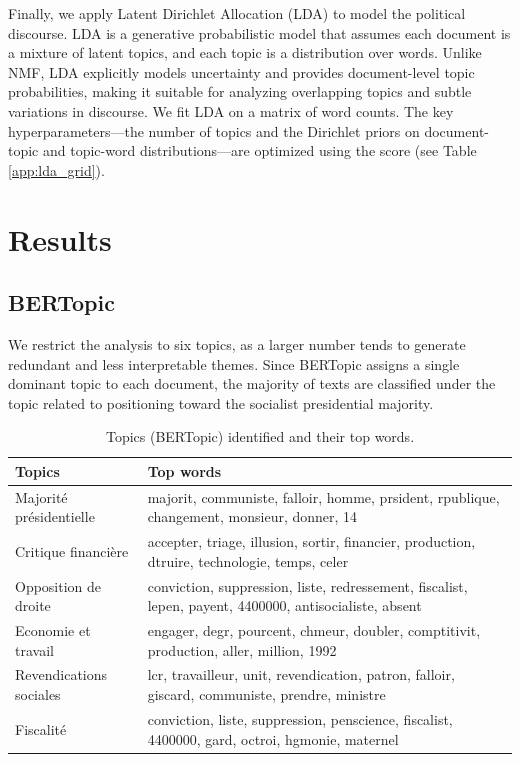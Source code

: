 \documentclass{article}
\begin{document}
Finally, we apply Latent Dirichlet Allocation (LDA) \citep{blei2003latent} to model the political discourse. LDA is a generative probabilistic model that assumes each document is a mixture of latent topics, and each topic is a distribution over words. Unlike NMF, LDA explicitly models uncertainty and provides document-level topic probabilities, making it suitable for analyzing overlapping topics and subtle variations in discourse. We fit LDA on a matrix of word counts. The key hyperparameters—the number of topics and the Dirichlet priors on document-topic and topic-word distributions—are optimized using the score  (see Table \ref{app:lda_grid}).

\section{Results}

\subsection{BERTopic}
We restrict the analysis to six topics, as a larger number tends to generate redundant and less interpretable themes. Since BERTopic assigns a single dominant topic to each document, the majority of texts are classified under the topic related to positioning toward the socialist presidential majority.

\begin{table}[htbp]
\centering
\small
\begin{tabular}{@{} l p{10cm} @{}}
\toprule
\textbf{Topics} & \textbf{Top words} \\
\midrule
Majorité présidentielle & majorit, communiste, falloir, homme, prsident, rpublique, changement, monsieur, donner, 14 \\
Critique financière & accepter, triage, illusion, sortir, financier, production, dtruire, technologie, temps, celer \\
Opposition de droite & conviction, suppression, liste, redressement, fiscalist, lepen, payent, 4400000, antisocialiste, absent \\
Economie et travail & engager, degr, pourcent, chmeur, doubler, comptitivit, production, aller, million, 1992 \\
Revendications sociales & lcr, travailleur, unit, revendication, patron, falloir, giscard, communiste, prendre, ministre \\
Fiscalité & conviction, liste, suppression, penscience, fiscalist, 4400000, gard, octroi, hgmonie, maternel \\
\bottomrule
\end{tabular}
\caption{Topics (BERTopic) identified and their top words.}
\label{tab:topics_summary}
\end{table}
\end{document}
